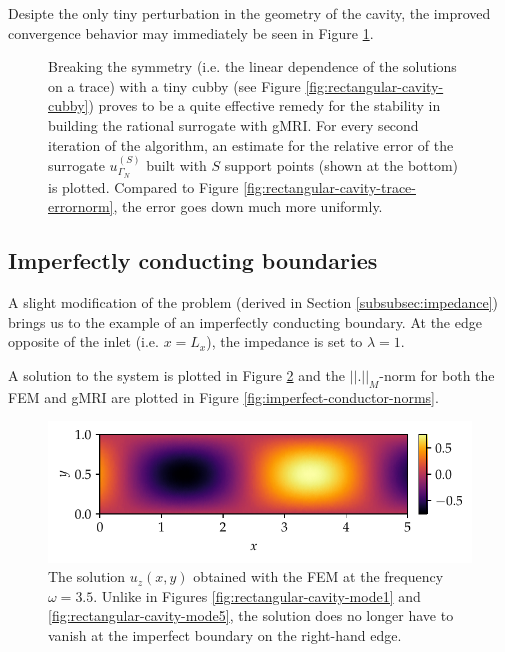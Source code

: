 \documentclass[11pt, a4paper]{article}
\begin{document}
Desipte the only tiny perturbation in the geometry of the cavity, the improved
convergence behavior may immediately be seen in Figure \ref{fig:rectangular-cubby-trace-errornorm}.

\begin{figure}[ht]
    \centering
    
    \caption{Breaking the symmetry (i.e. the linear dependence of the solutions
    on a trace) with a tiny cubby (see Figure \ref{fig:rectangular-cavity-cubby})
    proves to be a quite effective remedy for the stability in building the
    rational surrogate with \acrshort{gMRI}. For every second iteration of the 
    algorithm, an estimate for the relative error of the surrogate $u_{\Gamma_N}^{(S)}$
    built with $S$ support points (shown at the bottom) is plotted. Compared to
    Figure \ref{fig:rectangular-cavity-trace-errornorm}, the error goes down much
    more uniformly.}
    \label{fig:rectangular-cubby-trace-errornorm}
\end{figure}

\clearpage
\subsection{Imperfectly conducting boundaries}
\label{subsec:examples-impedance}

A slight modification of the problem (derived in Section \ref{subsubsec:impedance})
brings us to the example of an imperfectly conducting boundary. At the edge 
opposite of the inlet (i.e. $x=L_x$), the impedance is set to $\lambda=1$.

A solution to the system is plotted in Figure \ref{fig:imperfect-conductor-solution}
and the $||.||_M$-norm for both the \acrshort{FEM} and \acrshort{gMRI}
are plotted in Figure \ref{fig:imperfect-conductor-norms}.

\begin{figure}[ht]
    \centering
    \includegraphics{plots/imperfect_conductor_solution.pdf}
    \caption{The solution $u_z(x, y)$ obtained with the \acrshort{FEM} at the
    frequency $\omega = 3.5$. Unlike in Figures \ref{fig:rectangular-cavity-mode1}
    and \ref{fig:rectangular-cavity-mode5}, the solution does no longer have to
    vanish at the imperfect boundary on the right-hand edge.}
    \label{fig:imperfect-conductor-solution}
\end{figure}
\end{document}

